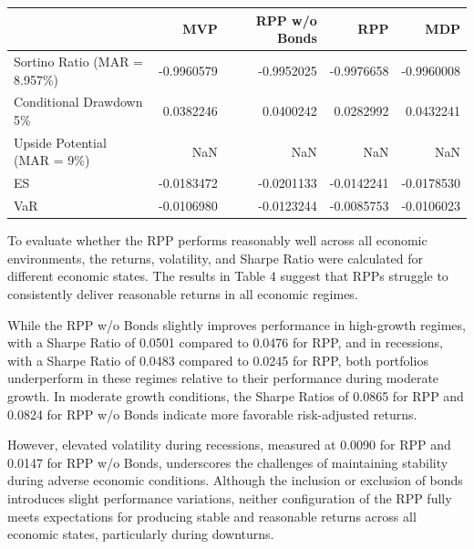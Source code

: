 \documentclass[11pt,preprint]{elsarticle}
\let\origtable\table
\let\endorigtable\endtable
\renewenvironment{table}[1][2] {
    \expandafter\origtable\expandafter[H]
} {
    \endorigtable
}
\numberwithin{equation}{section}
\numberwithin{figure}{section}
\numberwithin{table}{section}
\begin{document}
\begin{table}
\centering
\caption{\label{tab:downside-metrics}Downside and Opportunity-based Performance Metrics}
\centering
\begin{tabular}[t]{l|r|r|r|r}
\hline
  & MVP & RPP w/o Bonds & RPP & MDP\\
\hline
Sortino Ratio (MAR = 8.957\%) & -0.9960579 & -0.9952025 & -0.9976658 & -0.9960008\\
\hline
Conditional Drawdown 5\% & 0.0382246 & 0.0400242 & 0.0282992 & 0.0432241\\
\hline
Upside Potential (MAR = 9\%) & NaN & NaN & NaN & NaN\\
\hline
ES & -0.0183472 & -0.0201133 & -0.0142241 & -0.0178530\\
\hline
VaR & -0.0106980 & -0.0123244 & -0.0085753 & -0.0106023\\
\hline
\end{tabular}
\end{table}

To evaluate whether the RPP performs reasonably well across all economic
environments, the returns, volatility, and Sharpe Ratio were calculated
for different economic states. The results in Table 4 suggest that RPPs
struggle to consistently deliver reasonable returns in all economic
regimes.

While the RPP w/o Bonds slightly improves performance in high-growth
regimes, with a Sharpe Ratio of 0.0501 compared to 0.0476 for RPP, and
in recessions, with a Sharpe Ratio of 0.0483 compared to 0.0245 for RPP,
both portfolios underperform in these regimes relative to their
performance during moderate growth. In moderate growth conditions, the
Sharpe Ratios of 0.0865 for RPP and 0.0824 for RPP w/o Bonds indicate
more favorable risk-adjusted returns.

However, elevated volatility during recessions, measured at 0.0090 for
RPP and 0.0147 for RPP w/o Bonds, underscores the challenges of
maintaining stability during adverse economic conditions. Although the
inclusion or exclusion of bonds introduces slight performance
variations, neither configuration of the RPP fully meets expectations
for producing stable and reasonable returns across all economic states,
particularly during downturns.
\end{document}
